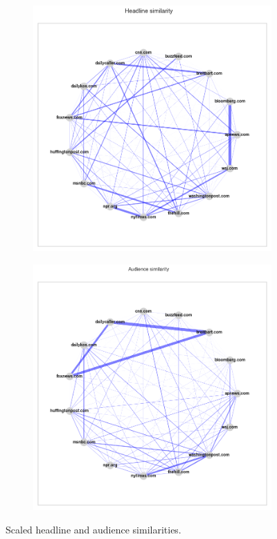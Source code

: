 \documentclass{scrartcl}
\begin{document}
\begin{figure}[H]
\centering
\begin{subfigure}{.5\textwidth}
  \centering
  \includegraphics[width=0.8\linewidth]{figures/hl-graph-radial-all-metrics.png}
\end{subfigure}%
\begin{subfigure}{.5\textwidth}
  \centering
  \includegraphics[width=0.8\linewidth]{figures/user-graph-radial-all-metrics.png}
\end{subfigure}
\caption{Scaled headline and audience similarities.}
\end{figure}
\end{document}
